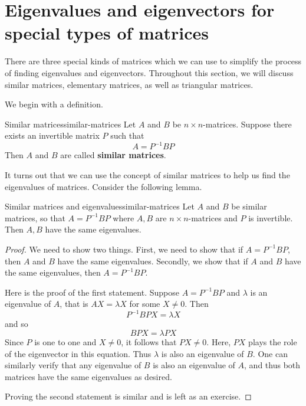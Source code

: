 \section{Eigenvalues and eigenvectors for special types of matrices}

There are three special kinds of matrices which we can use to simplify
the process of finding eigenvalues and eigenvectors.  Throughout this
section, we will discuss similar matrices, elementary matrices, as
well as triangular matrices.

We begin with a definition.

\begin{definition}{Similar matrices}{similar-matrices}
  Let $A$ and $B$ be $n \times n$-matrices. Suppose there exists an
  invertible matrix $P$ such that
  \begin{equation*}
    A = P^{-1}BP
  \end{equation*}
  Then $A$ and $B$ are called \textbf{similar matrices}.
\end{definition}

It turns out that we can use the concept of similar matrices to help
us find the eigenvalues of matrices. Consider the following lemma.

\begin{lemma}{Similar matrices and eigenvalues}{similar-matrices}
  Let $A$ and $B$ be similar matrices, so that $A=P^{-1}BP$ where
  $A,B$ are $n\times n$-matrices and $P$ is invertible. Then $A,B$
  have the same eigenvalues.
\end{lemma}

\begin{proof}
  We need to show two things. First, we need to show that if
  $A=P^{-1}BP$, then $A$ and $B$ have the same eigenvalues.  Secondly,
  we show that if $A$ and $B$ have the same eigenvalues, then
  $A=P^{-1}BP$.

  Here is the proof of the first statement.  Suppose $A = P^{-1}BP$
  and $\lambda$ is an eigenvalue of $A$, that is $AX=\lambda X$ for
  some $X\neq 0$. Then
  \begin{equation*}
    P^{-1}BPX=\lambda X
  \end{equation*}
  and so
  \begin{equation*}
    BPX=\lambda PX
  \end{equation*}
  Since $P$ is one to one and $X \neq 0$, it follows that $PX \neq
  0$. Here, $PX$ plays the role of the eigenvector in this equation.
  Thus $\lambda$ is also an eigenvalue of $B$. One can similarly
  verify that any eigenvalue of $B$ is also an eigenvalue of $A$, and
  thus both matrices have the same eigenvalues as desired.

  Proving the second statement is similar and is left as an exercise. 
\end{proof}

